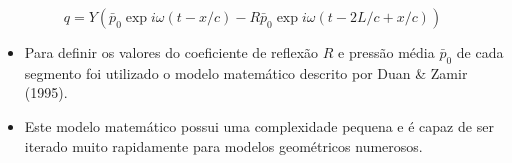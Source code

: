 \documentclass[10pt,aspectratio=169]{beamer}
\theoremstyle{remark}
\theoremstyle{definition}
\begin{document}
\begin{frame}[allowframebreaks]
		\begin{equation}
		q = Y(\bar{p}_0 \exp{i\omega(t - x/c)} -  R  \bar{p}_0 \exp{i\omega(t - 2L/c + x/c)})
		\label{04_1}
		\end{equation}
		
		\framebreak
		
		\begin{itemize}
			\item Para definir os valores do coeficiente de reflexão $R$ e pressão média $\bar{p}_0$ de cada segmento foi utilizado o modelo matemático descrito por Duan \& Zamir (1995).
			\item Este modelo matemático possui uma complexidade pequena e é capaz de ser iterado muito rapidamente para modelos geométricos numerosos.
		\end{itemize}
		
	\end{frame}
	
\end{document}

